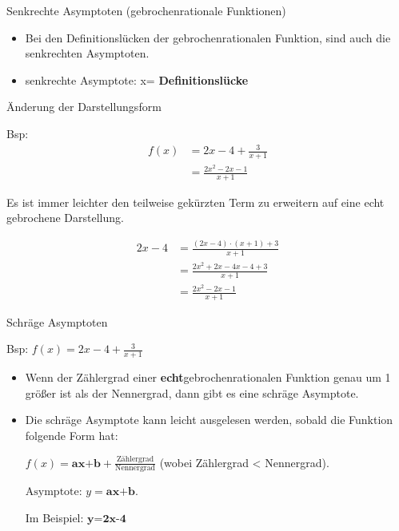 \begin{frage}Senkrechte Asymptoten (gebrochenrationale Funktionen)\end{frage}
\begin{antwort}\begin{itemize} 
		\item \large Bei den Definitionslücken der gebrochenrationalen Funktion, sind auch die senkrechten Asymptoten.		
		\item senkrechte Asymptote: x= \textbf{Definitionslücke}		
	\end{itemize}\end{antwort}
\begin{frage}Änderung der Darstellungsform \bigskip
	
	Bsp: 
	\begin{align*}
	f(x)&=2x -4 +\frac{3}{x+1}\\
	&=\frac{2x^2-2x-1}{x+1}
	\end{align*}\end{frage}
\begin{antwort}\large Es ist immer leichter den teilweise gekürzten Term zu erweitern auf eine echt gebrochene Darstellung.
		
	\begin{align*}
		2x-4&=\frac{(2x-4)\cdot(x+1)+3}{x+1} \\
		&=\frac{2x^2+2x-4x-4+3}{x+1} \\
		&=\frac{2x^2-2x-1}{x+1}
	\end{align*}\end{antwort}
\begin{frage}Schräge Asymptoten \bigskip
	
	Bsp: $f(x)=2x -4 +\frac{3}{x+1}$\end{frage}
\begin{antwort}\begin{itemize} 
		\item \large Wenn der Zählergrad einer \textbf{echt}gebrochenrationalen Funktion genau um 1 größer ist als der Nennergrad, dann gibt es eine schräge Asymptote.		
		
		\item Die schräge Asymptote kann leicht ausgelesen werden, sobald die Funktion folgende Form hat: 
		
		$f(x)=\textbf{ax+b} + \frac{\text{Zählergrad}}{\text{Nennergrad}}$ 
		(wobei Zählergrad < Nennergrad).
		
		$\text{Asymptote: } y=\textbf{ax+b}.$	
		
		Im Beispiel: $\textbf {y=2x-4}$
	\end{itemize}\end{antwort}
